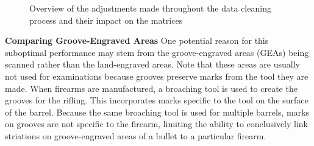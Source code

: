 \documentclass[
  12pt]{article}
\begin{document}
\begin{figure}
\begin{minipage}{0.47\linewidth}
{}


\end{minipage}%

\caption{\label{fig-matrixD}Overview of the adjustments made throughout
the data cleaning process and their impact on the matrices}

\end{figure}%

\textbf{Comparing Groove-Engraved Areas} One potential reason for this
suboptimal performance may stem from the groove-engraved areas (GEAs)
being scanned rather than the land-engraved areas. Note that these areas
are usually not used for examinations because grooves preserve marks
from the tool they are made. When firearms are manufactured, a broaching
tool is used to create the grooves for the rifling. This incorporates
marks specific to the tool on the surface of the barrel. Because the
same broaching tool is used for multiple barrels, marks on grooves are
not specific to the firearm, limiting the ability to conclusively link
striations on groove-engraved areas of a bullet to a particular firearm.
\end{document}
